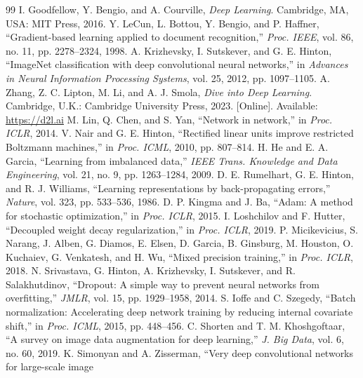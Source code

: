 \documentclass[12pt,letterpaper]{article}
\begin{document}
\begin{thebibliography}{99}
\small
\setlength{\itemsep}{1pt}
 I. Goodfellow, Y. Bengio, and A. Courville, \emph{Deep Learning}. Cambridge, MA, USA: MIT
  Press, 2016.
 Y. LeCun, L. Bottou, Y. Bengio, and P. Haffner, ``Gradient-based learning applied to document
  recognition,'' \emph{Proc. IEEE}, vol. 86, no. 11, pp. 2278--2324, 1998.
 A. Krizhevsky, I. Sutskever, and G. E. Hinton, ``ImageNet classification with deep
  convolutional neural networks,'' in \emph{Advances in Neural Information Processing Systems}, vol. 25, 2012,
  pp. 1097--1105.
 A. Zhang, Z. C. Lipton, M. Li, and A. J. Smola, \emph{Dive into Deep Learning}. Cambridge, U.K.:
  Cambridge University Press, 2023. [Online]. Available: \url{https://d2l.ai}
 M. Lin, Q. Chen, and S. Yan, ``Network in network,'' in \emph{Proc. ICLR}, 2014.
 V. Nair and G. E. Hinton, ``Rectified linear units improve restricted Boltzmann machines,'' in
  \emph{Proc. ICML}, 2010, pp. 807--814.
 H. He and E. A. Garcia, ``Learning from imbalanced data,'' \emph{IEEE Trans. Knowledge and Data
  Engineering}, vol. 21, no. 9, pp. 1263--1284, 2009.
 D. E. Rumelhart, G. E. Hinton, and R. J. Williams, ``Learning representations by
  back-propagating errors,'' \emph{Nature}, vol. 323, pp. 533--536, 1986.
 D. P. Kingma and J. Ba, ``Adam: A method for stochastic optimization,'' in \emph{Proc. ICLR},
  2015.
 I. Loshchilov and F. Hutter, ``Decoupled weight decay regularization,'' in \emph{Proc.
  ICLR}, 2019.
 P. Micikevicius, S. Narang, J. Alben, G. Diamos, E. Elsen, D. Garcia, B. Ginsburg,
  M. Houston, O. Kuchaiev, G. Venkatesh, and H. Wu, ``Mixed precision training,'' in \emph{Proc. ICLR}, 2018.
 N. Srivastava, G. Hinton, A. Krizhevsky, I. Sutskever, and R. Salakhutdinov, ``Dropout: A
  simple way to prevent neural networks from overfitting,'' \emph{JMLR}, vol. 15, pp. 1929--1958, 2014.
 S. Ioffe and C. Szegedy, ``Batch normalization: Accelerating deep network training by reducing
  internal covariate shift,'' in \emph{Proc. ICML}, 2015, pp. 448--456.
 C. Shorten and T. M. Khoshgoftaar, ``A survey on image data augmentation for deep learning,''
  \emph{J. Big Data}, vol. 6, no. 60, 2019.
 K. Simonyan and A. Zisserman, ``Very deep convolutional networks for large-scale image

\end{thebibliography}
\end{document}
